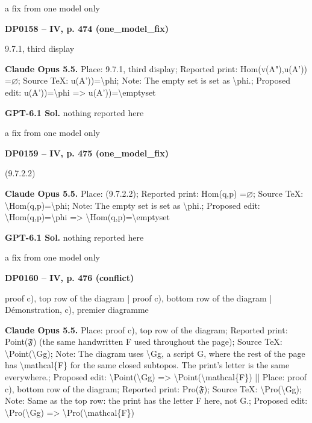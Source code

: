 a fix from one model only\par
\par\noindent\hypertarget{DP0158}{}\textbf{DP0158 -- IV, p. 474 (one\_model\_fix)}\par
9.7.1, third display\par
\textbf{Claude Opus 5.5.} Place: 9.7.1, third display; Reported print: Hom(v(A"),u(A')) =\allowbreak  \ensuremath{\varnothing}; Source TeX: u(A'))=\allowbreak \textbackslash{}phi; Note: The empty set is set as \textbackslash{}phi.; Proposed edit: u(A'))=\allowbreak \textbackslash{}phi =\allowbreak > u(A'))=\allowbreak \textbackslash{}emptyset\par
\textbf{GPT-6.1 Sol.} nothing reported here\par
a fix from one model only\par
\par\noindent\hypertarget{DP0159}{}\textbf{DP0159 -- IV, p. 475 (one\_model\_fix)}\par
(9.7.2.2)\par
\textbf{Claude Opus 5.5.} Place: (9.7.2.2); Reported print: Hom(q,p) =\allowbreak  \ensuremath{\varnothing}; Source TeX: \textbackslash{}Hom(q,p)=\allowbreak \textbackslash{}phi; Note: The empty set is set as \textbackslash{}phi.; Proposed edit: \textbackslash{}Hom(q,p)=\allowbreak \textbackslash{}phi =\allowbreak > \textbackslash{}Hom(q,p)=\allowbreak \textbackslash{}emptyset\par
\textbf{GPT-6.1 Sol.} nothing reported here\par
a fix from one model only\par
\par\noindent\hypertarget{DP0160}{}\textbf{DP0160 -- IV, p. 476 (conflict)}\par
proof c), top row of the diagram | proof c), bottom row of the diagram | Démonstration, c), premier diagramme\par
\textbf{Claude Opus 5.5.} Place: proof c), top row of the diagram; Reported print: Point(\ensuremath{𝔉}) (the same handwritten F used throughout the page); Source TeX: \textbackslash{}Point(\textbackslash{}Gg); Note: The diagram uses \textbackslash{}Gg, a script G, where the rest of the page has \textbackslash{}mathcal\{F\} for the same closed subtopos. The print's letter is the same everywhere.; Proposed edit: \textbackslash{}Point(\textbackslash{}Gg) =\allowbreak > \textbackslash{}Point(\textbackslash{}mathcal\{F\}) || Place: proof c), bottom row of the diagram; Reported print: Pro(\ensuremath{𝔉}); Source TeX: \textbackslash{}Pro(\textbackslash{}Gg); Note: Same as the top row: the print has the letter F here, not G.; Proposed edit: \textbackslash{}Pro(\textbackslash{}Gg) =\allowbreak > \textbackslash{}Pro(\textbackslash{}mathcal\{F\})\par
